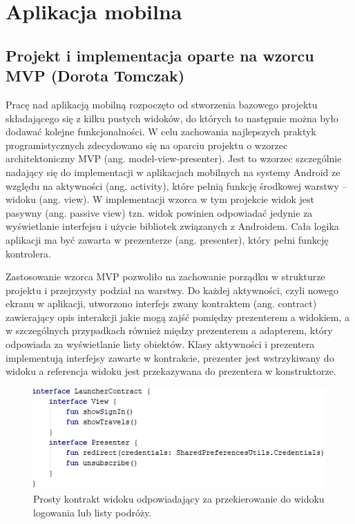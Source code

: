 \documentclass[10pt,twoside,a4paper]{report}
\begin{document}
\chapter{Aplikacja mobilna}

\section{Projekt i implementacja oparte na wzorcu MVP (Dorota Tomczak)}
\par Pracę nad aplikacją mobilną rozpoczęto od stworzenia bazowego projektu składającego się z kilku pustych widoków, do których to następnie można było dodawać kolejne funkcjonalności. W celu zachowania najlepszych praktyk programistycznych zdecydowano się na oparciu projektu o wzorzec architektoniczny MVP (ang. model-view-presenter). Jest to wzorzec szczególnie nadający się do implementacji w aplikacjach mobilnych na systemy Android ze względu na aktywności (ang. activity), które pełnią funkcję środkowej warstwy – widoku (ang. view). W implementacji wzorca w tym projekcie widok jest pasywny (ang. passive view) tzn. widok powinien odpowiadać jedynie za wyświetlanie interfejsu i użycie bibliotek związanych z Androidem. Cała logika aplikacji ma być zawarta w prezenterze (ang. presenter), który pełni funkcję kontrolera.

\par Zastosowanie wzorca MVP pozwoliło na zachowanie porządku w strukturze projektu i przejrzysty podział na warstwy. Do każdej aktywności, czyli nowego ekranu w aplikacji, utworzono interfejs zwany kontraktem (ang. contract) zawierający opis interakcji jakie mogą zajść pomiędzy prezenterem a widokiem, a w szczególnych przypadkach również między prezenterem a adapterem, który odpowiada za wyświetlanie listy obiektów. Klasy aktywności i prezentera implementują interfejsy zawarte w kontrakcie, prezenter jest wstrzykiwany do widoku a referencja widoku jest przekazywana do prezentera w konstruktorze.

\begin{figure}[h]
\centering
\includegraphics[width=\linewidth]{launcherContract}
\caption{Prosty kontrakt widoku odpowiadający za przekierowanie do widoku logowania lub listy podróży.}
\label{fig:launcherContract}
\end{figure}
\end{document}
